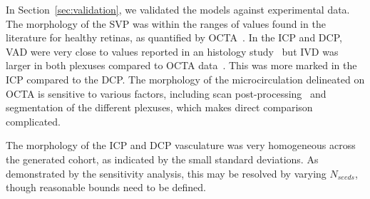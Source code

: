 \documentclass[11pt,]{article}
\begin{document}
In Section~\ref{sec:validation}, we validated the models against experimental data.
The morphology of the SVP was within the ranges of values found in the literature for healthy retinas, as quantified by OCTA~\cite{Mehta_2019,Chu2016,Liu_2021,Ma2021,Agarwal_2019}.
In the ICP and DCP, VAD were very close to values reported in an histology study~\cite{Chan2012} but IVD was larger in both plexuses compared to OCTA data~\cite{Liu_2021}.
This was more marked in the ICP compared to the DCP.
The morphology of the microcirculation delineated on OCTA is sensitive to various factors, including scan post-processing~\cite{Mehta_2020,Mehta_2019} and segmentation of the different plexuses, which makes direct comparison complicated.

The morphology of the ICP and DCP vasculature was very homogeneous across the generated cohort, as indicated by the small standard deviations.
As demonstrated by the sensitivity analysis, this may be resolved by varying $N_{seeds}$, though reasonable bounds need to be defined.
\end{document}
